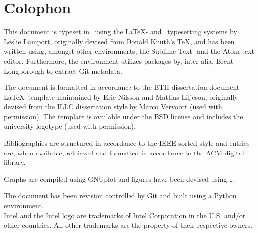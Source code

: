 
\chapter*{Colophon}
\label{cha:colophon}
This document is typeset in \fonttostring\ using the \LaTeX - and \BibTeX\ typesetting systems by Leslie Lamport, originally devised from Donald Knuth's \TeX , and has been written using, amongst other environments, the Sublime Text- and the Atom text editor.
Furthermore, the environment utilizes packages by, inter alia, Brent Longborough to extract Git metadata.

The document is formatted in accordance to the BTH dissertation document \LaTeX\ template maintained by Eric Nilsson and Mattias Liljeson, originally devised from the ILLC dissertation style by Marco Vervoort (used with permission).
The template is available under the BSD license and includes the university logotype (used with permission).

Bibliographies are structured in accordance to the IEEE sorted style and entries are, when available, retrieved and formatted in accordance to the ACM digital library.

Graphs are compiled using GNUplot and figures have been devised using \ldots\

The document has been revision controlled by Git and built using a Python environment.\\

\noindent
Intel and the Intel logo are trademarks of Intel Corporation in the U.S. and/or other countries.
All other trademarks are the property of their respective owners.






